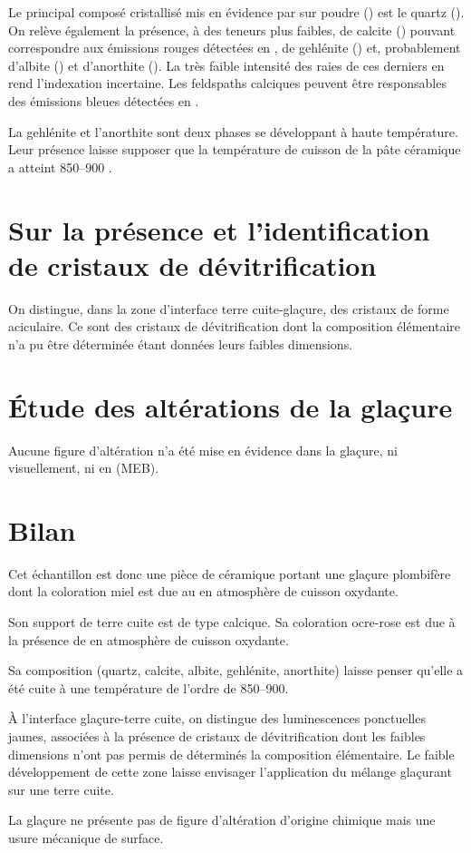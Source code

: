 Le principal composé cristallisé mis en évidence par \DX sur poudre 
() est le quartz (\quartz). On relève également la 
présence, à des teneurs plus faibles, de calcite (\calcite) pouvant 
correspondre aux émissions rouges détectées en \CL, de gehlénite 
(\gehlenite) et, probablement d'albite (\albite) et d'anorthite 
(\anorthite). La très faible intensité des raies de ces derniers en 
rend l'indexation incertaine. Les feldspaths calciques peuvent être 
responsables des émissions bleues détectées en \CL.

La gehlénite et l'anorthite sont deux phases se développant à 
haute température. Leur présence laisse supposer que la température 
de cuisson de la pâte céramique a atteint 
\SIrange[range-phrase=\ à\ ]{850}{900}{\degC} \autocite{Peters_1978}.


\section{Sur la présence et l'identification de cristaux de 
         dévitrification}

On distingue, dans la zone d'interface terre cuite-glaçure, des 
cristaux de forme aciculaire. Ce sont des cristaux de dévitrification 
dont la composition élémentaire n'a pu être déterminée étant données 
leurs faibles dimensions.


\section{Étude des altérations de la glaçure}

Aucune figure d'altération n'a été mise en évidence dans la glaçure, 
ni visuellement, ni en \MEB[ie] (MEB).


\section{Bilan}

Cet échantillon est donc une pièce de céramique portant une glaçure 
plombifère dont la coloration miel est due au  en atmosphère 
de cuisson oxydante.

Son support de terre cuite est de type calcique. Sa coloration 
ocre-rose est due à la présence de  en atmosphère de 
cuisson oxydante.

Sa composition \cristallo (quartz, calcite, albite, gehlénite, 
anorthite) laisse penser qu'elle a été cuite à une température de 
l'ordre de \SIrange[range-phrase=\ à\ ]{850}{900}{\degC}.

À l'interface glaçure-terre cuite, on distingue des luminescences 
ponctuelles jaunes, associées à la présence de cristaux de 
dévitrification dont les faibles dimensions n'ont pas permis de 
déterminés la composition élémentaire. Le faible développement de 
cette zone laisse envisager l'application du mélange glaçurant sur 
une terre cuite.

La glaçure ne présente pas de figure d'altération d'origine chimique 
mais une usure mécanique de surface.
